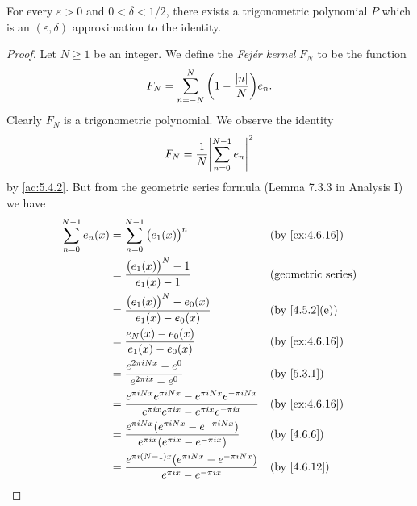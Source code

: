\begin{lem}\label{5.4.6}
  For every \(\varepsilon > 0\) and \(0 < \delta < 1 / 2\), there exists a trigonometric polynomial \(P\) which is an \((\varepsilon, \delta)\) approximation to the identity.
\end{lem}

\begin{proof}
  Let \(N \geq 1\) be an integer.
  We define the \emph{Fejér kernel} \(F_N\) to be the function
  \[
    F_N = \sum_{n = -N}^N \bigg(1 - \dfrac{\left\lvert n\right\rvert}{N}\bigg) e_n.
  \]
  Clearly \(F_N\) is a trigonometric polynomial.
  We observe the identity
  \[
    F_N = \dfrac{1}{N} \abs{\sum_{n = 0}^{N - 1} e_n}^2
  \]
  by \cref{ac:5.4.2}.
  But from the geometric series formula (Lemma 7.3.3 in Analysis I) we have
  \begin{align*}
    \sum_{n = 0}^{N - 1} e_n(x) & = \sum_{n = 0}^{N - 1} \big(e_1(x)\big)^n                                                                                &  & \by{ex:4.6.16}              \\
                                & = \dfrac{\big(e_1(x)\big)^N - 1}{e_1(x) - 1}                                                                             &  & \text{(geometric series)}   \\
                                & = \dfrac{\big(e_1(x)\big)^N - e_0(x)}{e_1(x) - e_0(x)}                                                                   &  & \text{(by \cref{4.5.2}(e))} \\
                                & = \dfrac{e_N(x) - e_0(x)}{e_1(x) - e_0(x)}                                                                               &  & \by{ex:4.6.16}              \\
                                & = \dfrac{e^{2 \pi i N x} - e^0}{e^{2 \pi i x} - e^0}                                                                     &  & \by{5.3.1}                  \\
                                & = \dfrac{e^{\pi i N x} e^{\pi i N x} - e^{\pi i N x} e^{-\pi i N x}}{e^{\pi i x} e^{\pi i x} - e^{\pi i x} e^{-\pi i x}} &  & \by{ex:4.6.16}              \\
                                & = \dfrac{e^{\pi i N x} (e^{\pi i N x} - e^{-\pi i N x})}{e^{\pi i x} (e^{\pi i x} - e^{-\pi i x})}                       &  & \by{4.6.6}                  \\
                                & = \dfrac{e^{\pi i (N - 1) x} (e^{\pi i N x} - e^{-\pi i N x})}{e^{\pi i x} - e^{-\pi i x}}                               &  & \by{4.6.12}                 \\

\end{align*}
\end{proof}
